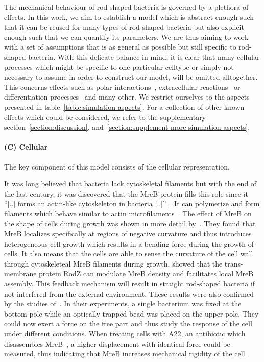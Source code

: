 \documentclass{article}
\begin{document}
The mechanical behaviour of rod-shaped bacteria is governed by a plethora of effects.
In this work, we aim to establish a model which is abstract enough such that it can be reused for
many types of rod-shaped bacteria but also explicit enough such that we can quantify its parameters.
We are thus aiming to work with a set of assumptions that is as general as possible but still
specific to rod-shaped bacteria.
With this delicate balance in mind, it is clear that many cellular processes which might be specific
to one particular celltype or simply not necessary to assume in order to construct our model, will
be omitted alltogether.
This concerns effects such as polar interactions~\cite{Duvernoy2018}, extracellular
reactions~\cite{Wang2010} or differentiation processes~\cite{vanGestel2015,Lpez2010} and many other.
We restrict ourselves to the aspects presented in table~\ref{table:simulation-aspects}.
For a collection of other known effects which could be considered, we refer to the supplementary
section~\ref{section:discussion}, and~\ref{section:supplement-more-simulation-aspects}.

\paragraph{(C) Cellular}
The key component of this model consists of the cellular representation.

It was long believed that bacteria lack cytoskeletal filaments but with the end of the last century,
it was discovered that the MreB protein fills this role since it “[..] forms an actin-like
cytoskeleton in bacteria [..]”~\cite{Erickson2001}.
It can polymerize and form filaments which behave similar to actin microfilaments~\cite{Dersch2020}.
The effect of MreB on the shape of cells during growth was shown in more detail
by~\cite{Ursell2014}.
They found that MreB localizes specifically at regions of negative curvature and thus introduces
heterogeneous cell growth which results in a bending force during the growth of cells.
It also means that the cells are able to sense the curvature of the cell wall through cytoskeleteal
MreB filaments during growth.
\cite{Bratton2018} showed that the trans-membrane protein RodZ can modulate MreB density and
facilitates local MreB assembly.
This feedback mechanism will result in straight rod-shaped bacteria if not interfered from the
external environment.
These results were also confirmed by the studies of~\cite{Wang2010}.
In their experiments, a single bacterium was fixed at the bottom pole while an optically trapped
bead was placed on the upper pole.
They could now exert a force on the free part and thus study the response of the cell under
different conditions.
When treating cells with A22, an antibiotic which disassembles
MreB~\cite{IWAI2002,Gitai2005,Karczmarek2007,Bean2009}, a higher displacement with identical force
could be measured, thus indicating that MreB increases mechanical rigidity of the cell.
\end{document}
